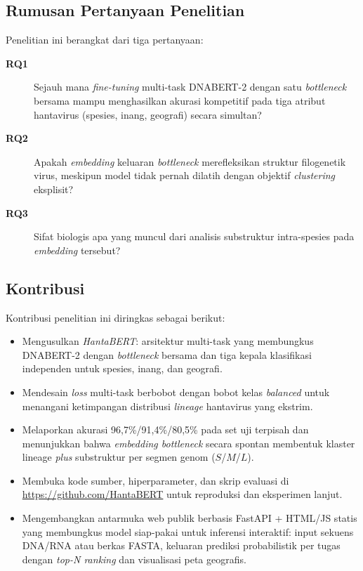 \documentclass[conference]{IEEEtran}
\begin{document}
\subsection{Rumusan Pertanyaan Penelitian}

Penelitian ini berangkat dari tiga pertanyaan:
\begin{description}
  \item[\textbf{RQ1}] Sejauh mana \emph{fine-tuning} multi-task
        DNABERT-2 dengan satu \emph{bottleneck} bersama mampu menghasilkan
        akurasi kompetitif pada tiga atribut hantavirus (spesies, inang,
        geografi) secara simultan?
  \item[\textbf{RQ2}] Apakah \emph{embedding} keluaran \emph{bottleneck}
        merefleksikan struktur filogenetik virus, meskipun model tidak
        pernah dilatih dengan objektif \emph{clustering} eksplisit?
  \item[\textbf{RQ3}] Sifat biologis apa yang muncul dari analisis
        substruktur intra-spesies pada \emph{embedding} tersebut?
\end{description}

\subsection{Kontribusi}

Kontribusi penelitian ini diringkas sebagai berikut:
\begin{itemize}
  \item Mengusulkan \emph{HantaBERT}: arsitektur multi-task yang
        membungkus DNABERT-2 dengan \emph{bottleneck} bersama dan tiga
        kepala klasifikasi independen untuk spesies, inang, dan geografi.
  \item Mendesain \emph{loss} multi-task berbobot dengan bobot kelas
        \emph{balanced} untuk menangani ketimpangan distribusi
        \emph{lineage} hantavirus yang ekstrim.
  \item Melaporkan akurasi 96{,}7\%/91{,}4\%/80{,}5\% pada set uji
        terpisah dan menunjukkan bahwa \emph{embedding bottleneck} secara
        spontan membentuk klaster lineage \emph{plus} substruktur per
        segmen genom ($S$/$M$/$L$).
  \item Membuka kode sumber, hiperparameter, dan skrip evaluasi di
        \url{https://github.com/HantaBERT} untuk reproduksi dan
        eksperimen lanjut.
  \item Mengembangkan antarmuka web publik berbasis FastAPI + HTML/JS
        statis yang membungkus model siap-pakai untuk inferensi
        interaktif: input sekuens DNA/RNA atau berkas FASTA, keluaran
        prediksi probabilistik per tugas dengan \emph{top-N ranking}
        dan visualisasi peta geografis.
\end{itemize}
\end{document}
